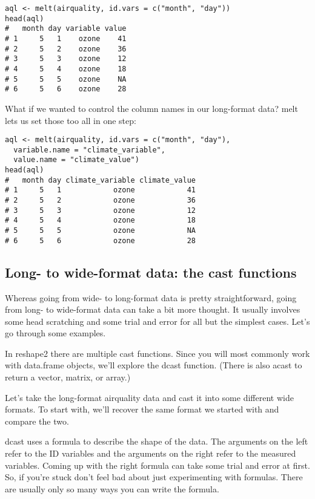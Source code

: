 \documentclass[french]{article}
\begin{document}
\begin{framed}
\begin{verbatim}
aql <- melt(airquality, id.vars = c("month", "day"))
head(aql)
#   month day variable value
# 1     5   1    ozone    41
# 2     5   2    ozone    36
# 3     5   3    ozone    12
# 4     5   4    ozone    18
# 5     5   5    ozone    NA
# 6     5   6    ozone    28
\end{verbatim}
\end{framed}
What if we wanted to control the column names in our long-format data? melt lets us set those too all in one step:
\begin{framed}
\begin{verbatim}
aql <- melt(airquality, id.vars = c("month", "day"),
  variable.name = "climate_variable", 
  value.name = "climate_value")
head(aql)
#   month day climate_variable climate_value
# 1     5   1            ozone            41
# 2     5   2            ozone            36
# 3     5   3            ozone            12
# 4     5   4            ozone            18
# 5     5   5            ozone            NA
# 6     5   6            ozone            28
\end{verbatim}
\end{framed}
\subsection{Long- to wide-format data: the cast functions}
Whereas going from wide- to long-format data is pretty straightforward, going from long- to wide-format data can take a bit more thought. It usually involves some head scratching and some trial and error for all but the simplest cases. Let’s go through some examples.

In reshape2 there are multiple cast functions. Since you will most commonly work with data.frame objects, we’ll explore the dcast function. (There is also acast to return a vector, matrix, or array.)

Let’s take the long-format airquality data and cast it into some different wide formats. To start with, we’ll recover the same format we started with and compare the two.

dcast uses a formula to describe the shape of the data. The arguments on the left refer to the ID variables and the arguments on the right refer to the measured variables. Coming up with the right formula can take some trial and error at first. So, if you’re stuck don’t feel bad about just experimenting with formulas. There are usually only so many ways you can write the formula.
\end{document}
